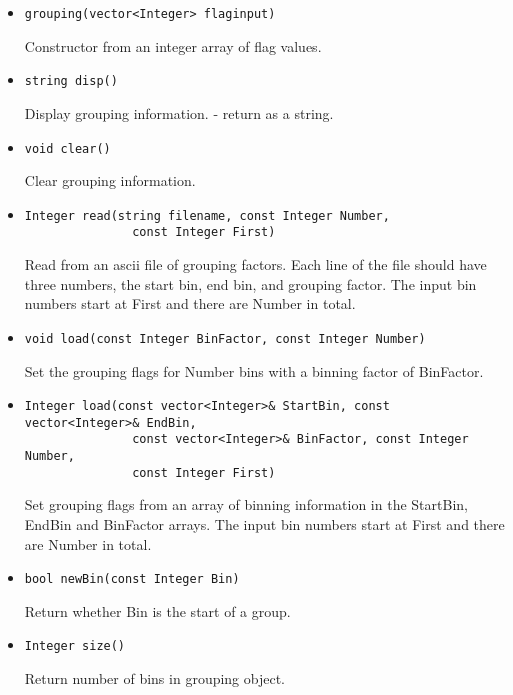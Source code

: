 \documentclass[11pt]{book}
\begin{document}
\begin{itemize}

\item  \begin{verbatim}grouping(vector<Integer> flaginput) \end{verbatim}

          Constructor from an integer array of flag values.

\item  \begin{verbatim}string disp() \end{verbatim}  

          Display grouping information. - return as a string.

\item  \begin{verbatim}void clear() \end{verbatim}  

          Clear grouping information.

\item  \begin{verbatim}Integer read(string filename, const Integer Number, 
               const Integer First) \end{verbatim}

          Read from an ascii file of grouping factors. Each line of
          the file should have three numbers, the start bin, end bin, and
          grouping factor. The input bin numbers start at First and
          there are Number in total.

\item  \begin{verbatim}void load(const Integer BinFactor, const Integer Number) \end{verbatim}

          Set the grouping flags for Number bins with a binning factor
          of BinFactor.

\item  \begin{verbatim}Integer load(const vector<Integer>& StartBin, const vector<Integer>& EndBin, 
               const vector<Integer>& BinFactor, const Integer Number, 
               const Integer First) \end{verbatim}

         Set grouping flags from an array of binning information in
         the StartBin, EndBin and BinFactor arrays. The input bin
         numbers start at First and there are Number in total.

\item  \begin{verbatim}bool newBin(const Integer Bin) \end{verbatim}

          Return whether Bin is the start of a group.

\item  \begin{verbatim}Integer size() \end{verbatim}

          Return number of bins in grouping object.

\end{itemize}
\end{document}
